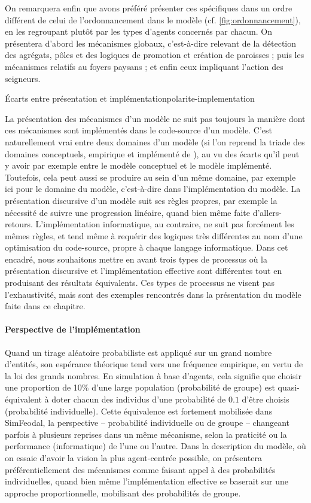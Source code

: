 On remarquera enfin que avons préféré présenter ces spécifiques dans un ordre différent de celui de l'ordonnancement dans le modèle (cf. \cref{fig:ordonnancement}), en les regroupant plutôt par les types d'agents concernés par chacun.
On présentera d'abord les mécanismes \og globaux\fg{}, c'est-à-dire relevant de la détection des agrégats, pôles et des logiques de promotion et création de paroisses ; puis les mécanismes relatifs au foyers paysans ; et enfin ceux impliquant l'action des seigneurs.

\bigskip 
\begin{encadre}{Écarts entre présentation et implémentation}{polarite-implementation}
	
La présentation des mécanismes d'un modèle ne suit pas toujours la manière dont ces mécanismes sont implémentés dans le code-source d'un modèle.
C'est naturellement vrai entre deux \og domaines\fg{} d'un modèle (si l'on reprend la triade des domaines conceptuels, empirique et implémenté de \textcite{livet2014diversite}), au vu des écarts qu'il peut y avoir par exemple entre le modèle conceptuel et le modèle implémenté.
Toutefois, cela peut aussi se produire au sein d'un même domaine, par exemple ici pour le \og domaine du modèle\fg{}, c'est-à-dire dans l'implémentation du modèle.
La présentation discursive d'un modèle suit ses règles propres, par exemple la nécessité de suivre une progression linéaire, quand bien même faite d'allers-retours.
L'implémentation informatique, au contraire, ne suit pas forcément les mêmes règles, et tend même à requérir des logiques très différentes au nom d'une \og optimisation\fg{} du code-source, propre à chaque langage informatique.
Dans cet encadré, nous souhaitons mettre en avant trois types de processus où la présentation discursive et l'implémentation effective sont différentes tout en produisant des résultats équivalents.
Ces types de processus ne visent pas l'exhaustivité, mais sont des exemples rencontrés dans la présentation du modèle faite dans ce chapitre.

\paragraph{Perspective de l'implémentation} Quand un tirage aléatoire probabiliste est appliqué sur un grand nombre d'entités, son espérance théorique tend vers une fréquence empirique, en vertu de la loi des grands nombres.
En simulation à base d'agents, cela signifie que choisir une proportion de 10\% d'une large population (\og probabilité de groupe\fg{}) est quasi-équivalent à doter chacun des individus d'une probabilité de $0.1$ d'être choisis (\og probabilité individuelle\fg{}).
Cette équivalence est fortement mobilisée dans SimFeodal, la \og perspective\fg{} -- probabilité individuelle ou de groupe -- changeant parfois à plusieurs reprises dans un même mécanisme, selon la praticité ou la performance (informatique) de l'une ou l'autre.
Dans la description du modèle, où on essaie d'avoir la vision la plus \og agent-centrée\fg{} possible, on présentera préférentiellement des mécanismes comme faisant appel à des probabilités individuelles, quand bien même l'implémentation effective se baserait sur une approche proportionnelle, mobilisant des probabilités de groupe.


\end{encadre}
